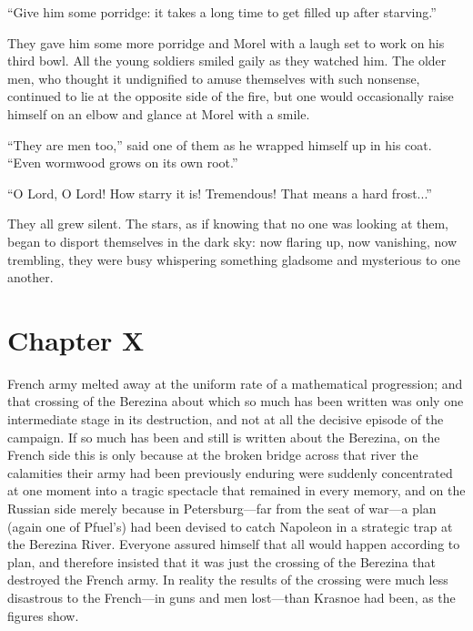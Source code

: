 ``Give him some porridge: it takes a long time to get filled up
after starving.''

They gave him some more porridge and Morel with a laugh set to
work on his third bowl. All the young soldiers smiled gaily as
they watched him.  The older men, who thought it undignified to
amuse themselves with such nonsense, continued to lie at the
opposite side of the fire, but one would occasionally raise
himself on an elbow and glance at Morel with a smile.

``They are men too,'' said one of them as he wrapped himself up
in his coat. ``Even wormwood grows on its own root.''

``O Lord, O Lord! How starry it is! Tremendous! That means a hard
frost...''

They all grew silent. The stars, as if knowing that no one was
looking at them, began to disport themselves in the dark sky: now
flaring up, now vanishing, now trembling, they were busy
whispering something gladsome and mysterious to one another.


\chapter*{Chapter X}
\ifaudio 
{}
\fi

 French army melted away at the uniform rate of a mathematical
progression; and that crossing of the Berezina about which so
much has been written was only one intermediate stage in its
destruction, and not at all the decisive episode of the
campaign. If so much has been and still is written about the
Berezina, on the French side this is only because at the broken
bridge across that river the calamities their army had been
previously enduring were suddenly concentrated at one moment into
a tragic spectacle that remained in every memory, and on the
Russian side merely because in Petersburg---far from the seat of
war---a plan (again one of Pfuel's) had been devised to catch
Napoleon in a strategic trap at the Berezina River. Everyone
assured himself that all would happen according to plan, and
therefore insisted that it was just the crossing of the Berezina
that destroyed the French army. In reality the results of the
crossing were much less disastrous to the French---in guns and
men lost---than Krasnoe had been, as the figures show.

